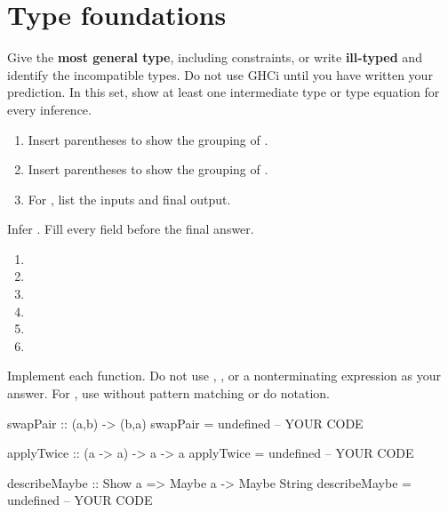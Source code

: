 \chapter{Type foundations}
Give the \textbf{most general type}, including constraints, or write
\textbf{ill-typed} and identify the incompatible types. Do not use GHCi until
you have written your prediction. In this set, show at least one intermediate
type or type equation for every inference.

\begin{enumerate}[label=(\alph*)]
\item Insert parentheses to show the grouping of .
\item Insert parentheses to show the grouping of .
\item For , list the inputs and final output.
\end{enumerate}

Infer . Fill every field before the final answer.

\begin{enumerate}[label=(\alph*)]
\item {}
\item \code{\xs -> [x | x <- xs, x]}
\item \code{\xs -> [even x | x <- xs]}
\item {}
\item {}
\item {}
\end{enumerate}

Implement each function. Do not use , , or a
nonterminating expression as your answer. For , use
\code{<$>} without pattern matching or do notation.
\par\noindent\begin{minipage}{\linewidth}
\begin{codeanswer}
swapPair :: (a,b) -> (b,a)
swapPair = undefined  -- YOUR CODE

applyTwice :: (a -> a) -> a -> a
applyTwice = undefined  -- YOUR CODE

describeMaybe :: Show a => Maybe a -> Maybe String
describeMaybe = undefined  -- YOUR CODE
\end{codeanswer}
\end{minipage}\par

